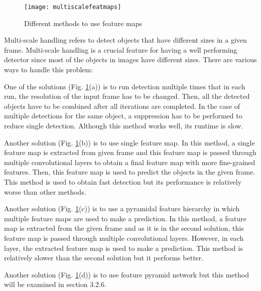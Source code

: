 \documentclass{article}
\begin{document}
\setlength{\parindent}{6ex}

\begin{figure}
    \centering
    \texttt{[image: multiscalefeatmaps]}
    \caption{Different methods to use feature maps}
    \label{fig:multiscalefeatmaps1}
\end{figure}

\indent

Multi-scale handling refers to detect objects that have different 
sizes in a given frame. Multi-scale handling is a crucial feature for 
having a well performing detector since most of the objects in images
have different sizes. There are various ways to handle this problem: \par

One of the solutions (Fig. \ref{fig:multiscalefeatmaps1}(a)) is to run detection multiple times that in each 
run, the resolution of the input frame has to be changed. Then, all the 
detected objects have to be combined after all iterations are completed. 
In the case of multiple detections for the same object, a suppression has to be 
performed to reduce single detection. Although this method works well, 
its runtime is slow. \par

Another solution (Fig. \ref{fig:multiscalefeatmaps1}(b)) is to use single feature map. In this method, a single 
feature map is extracted from given frame and this feature map is passed 
through multiple convolutional layers to obtain a final feature map with 
more fine-grained features. Then, this feature map is used to predict the 
objects in the given frame. This method is used to obtain fast detection but 
its performance is relatively worse than other methods. \par

Another solution (Fig. \ref{fig:multiscalefeatmaps1}(c)) is to use a pyramidal feature hierarchy in which multiple 
feature maps are used to make a prediction. In this method, a feature map 
is extracted from the given frame and as it is in the second solution, this 
feature map is passed through multiple convolutional layers. However, 
in each layer, the extracted feature map is used to make a prediction. This 
method is relatively slower than the second solution but it performs better. \par

Another solution (Fig. \ref{fig:multiscalefeatmaps1}(d)) is to use feature pyramid network but this method will be 
examined in section 3.2.6. 
\end{document}
